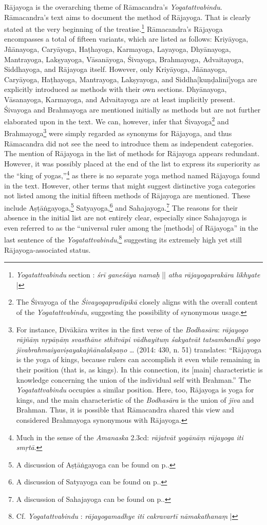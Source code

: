 Rājayoga is the overarching theme of Rāmacandra's \emph{Yogatattvabindu}. Rāmacandra's text aims to document the method of Rājayoga. That is clearly stated at the very beginning of the treatise.\footnote{\emph{Yogatattvabindu} section : \textit{śrī ganeśāya namaḥ} || \textit{atha rājayogaprakāra likhyate} |} Rāmacandra's Rājayoga encompasses a total of fifteen variants, which are listed as follows: Kriyāyoga, Jñānayoga, Caryāyoga, Haṭhayoga, Karmayoga, Layayoga, Dhyānayoga, Mantrayoga, Lakṣyayoga, Vāsanāyoga, Śivayoga, Brahmayoga, Advaitayoga, Siddhayoga, and Rājayoga itself. However, only Kriyāyoga, Jñānayoga, Caryāyoga, Haṭhayoga, Mantrayoga, Lakṣyayoga, and Siddha[kuṇḍalinī]yoga are explicitly introduced as methods with their own sections. Dhyānayoga, Vāsanayoga, Karmayoga, and Advaitayoga are at least implicitly present. Śivayoga and Brahmayoga are mentioned initially as methods but are not further elaborated upon in the text. We can, however, infer that Śivayoga\footnote{The Śivayoga of the \textit{Śivayogapradīpikā} closely aligns with the overall content of the \textit{Yogatattvabindu}, suggesting the possibility of synonymous usage.} and Brahmayoga\footnote{For instance, Divākāra writes in the first verse of the \textit{Bodhasāra}: \textit{rājayogo rājñāṃ nṛpāṇāṃ svasthāne sthitvāpi vādhayituṃ śakyatvāt tatsambandhī yogo jīvabrahmaiyaviṣayakajñānalakṣaṇo} \ldots \citeauthor{birch2014} (2014: 430, n. 51) translates: ``Rājayoga is the yoga of kings, because rulers can accomplish it even while remaining in their position (that is, as kings). In this connection, its [main] characteristic is knowledge concerning the union of the individual self with Brahman.'' The \emph{Yogatattvabindu} occupies a similar position. Here, too, Rājayoga is yoga for kings, and the main characteristic of the \emph{Bodhasāra} is the union of \textit{jīva} and Brahman. Thus, it is possible that Rāmacandra shared this view and considered Brahmayoga synonymous with Rājayoga.} were simply regarded as synonyms for Rājayoga, and thus Rāmacandra did not see the need to introduce them as independent categories. The mention of Rājayoga in the list of methods for Rājayoga appears redundant. However, it was possibly placed at the end of the list to express its superiority as the ``king of yogas,''\footnote{Much in the sense of the \emph{Amanaska} 2.3cd: \textit{rājatvāt yogānāṃ rājayoga iti smṛtā}.} as there is no separate yoga method named Rājayoga found in the text. However, other terms that might suggest distinctive yoga categories not listed among the initial fifteen methods of Rājayoga are mentioned. These include Aṣṭāṅgayoga,\footnote{A discussion of Aṣṭāṅgayoga can be found on p.\pageref{ashtangayoga}.} Satyayoga,\footnote{A discussion of Satyayoga can be found on p.\pageref{satyayoga}.} and Sahajayoga.\footnote{A discussion of Sahajayoga can be found on p.\pageref{sahajayoga}.} The reasons for their absence in the initial list are not entirely clear, especially since Sahajayoga is even referred to as the ``universal ruler among the [methods] of Rājayoga'' in the last sentence of the \textit{Yogatattvabindu},\footnote{Cf. \emph{Yogatattvabindu} : \textit{rājayogamadhye iti cakravartī nāmakathanaṃ} |} suggesting its extremely high yet still Rājayoga-associated status.

